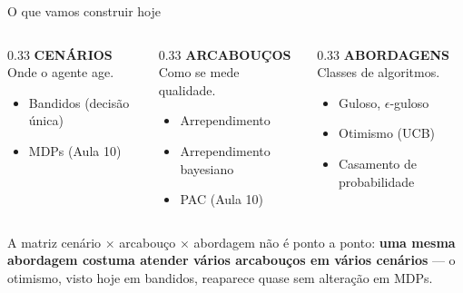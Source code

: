 \documentclass[aspectratio=169, 10pt]{beamer}
\begin{document}
\begin{frame}{O que vamos construir hoje}
  \begin{columns}[T]
    \begin{column}{0.33\textwidth}
      {\color{rlTeal}\bfseries CENÁRIOS}\\[0.3em]
      {\small Onde o agente age.}
      \begin{itemize}\small
        \item Bandidos (decisão única)
        \item MDPs (Aula 10)
      \end{itemize}
    \end{column}
    \begin{column}{0.33\textwidth}
      {\color{rlAzulClaro}\bfseries ARCABOUÇOS}\\[0.3em]
      {\small Como se mede qualidade.}
      \begin{itemize}\small
        \item Arrependimento
        \item Arrependimento bayesiano
        \item PAC (Aula 10)
      \end{itemize}
    \end{column}
    \begin{column}{0.33\textwidth}
      {\color{rlLaranja}\bfseries ABORDAGENS}\\[0.3em]
      {\small Classes de algoritmos.}
      \begin{itemize}\small
        \item Guloso, $\epsilon$-guloso
        \item Otimismo (UCB)
        \item Casamento de probabilidade
      \end{itemize}
    \end{column}
  \end{columns}

  \bigskip
  \begin{ideiabox}
    A matriz cenário $\times$ arcabouço $\times$ abordagem não é ponto a
    ponto: \textbf{uma mesma abordagem costuma atender vários arcabouços em
    vários cenários} — o otimismo, visto hoje em bandidos, reaparece quase
    sem alteração em MDPs.
  \end{ideiabox}
\end{frame}

\end{document}
